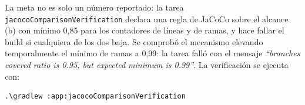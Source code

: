 La meta no es solo un número reportado: la tarea \texttt{jacocoComparisonVerification}
declara una regla de JaCoCo sobre el alcance (b) con mínimo 0,85 para los contadores de
líneas y de ramas, y hace fallar el build si cualquiera de los dos baja. Se comprobó el
mecanismo elevando temporalmente el mínimo de ramas a 0,99: la tarea falló con el mensaje
\emph{``branches covered ratio is 0.95, but expected minimum is 0.99''}. La verificación se
ejecuta con:

\begin{verbatim}
.\gradlew :app:jacocoComparisonVerification
\end{verbatim}

